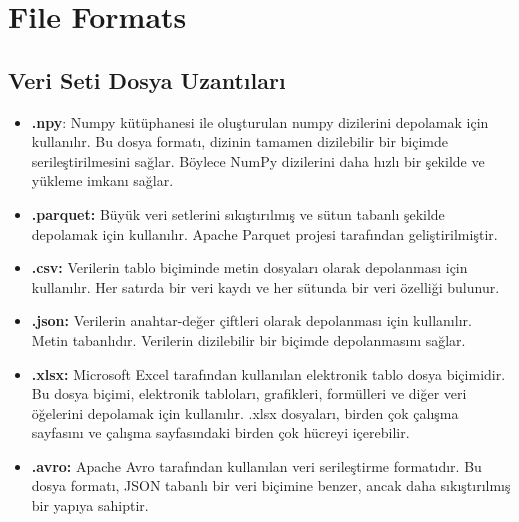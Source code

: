 \section{File Formats}
\subsection{Veri Seti Dosya Uzantıları}
\begin{itemize}
    \item \textbf{.npy}: Numpy kütüphanesi ile oluşturulan numpy dizilerini depolamak için kullanılır. Bu dosya formatı, dizinin tamamen dizilebilir bir biçimde serileştirilmesini sağlar. Böylece NumPy dizilerini daha hızlı bir şekilde ve yükleme imkanı sağlar. 
    \item \textbf{.parquet:} Büyük veri setlerini sıkıştırılmış ve sütun tabanlı şekilde depolamak için kullanılır. Apache Parquet projesi tarafından geliştirilmiştir.
    \item \textbf{.csv:} Verilerin tablo biçiminde metin dosyaları olarak depolanması için kullanılır. Her satırda bir veri kaydı ve her sütunda bir veri özelliği bulunur.
    \item \textbf{.json:} Verilerin anahtar-değer çiftleri olarak depolanması için kullanılır. Metin tabanlıdır. Verilerin dizilebilir bir biçimde depolanmasını sağlar.
    \item \textbf{.xlsx:} Microsoft Excel tarafından kullanılan elektronik tablo dosya biçimidir. Bu dosya biçimi, elektronik tabloları, grafikleri, formülleri ve diğer veri öğelerini depolamak için kullanılır. .xlsx dosyaları, birden çok çalışma sayfasını ve çalışma sayfasındaki birden çok hücreyi içerebilir.
    \item \textbf{.avro:} Apache Avro tarafından kullanılan veri serileştirme formatıdır. Bu dosya formatı, JSON tabanlı bir veri biçimine benzer, ancak daha sıkıştırılmış bir yapıya sahiptir.
\end{itemize}

